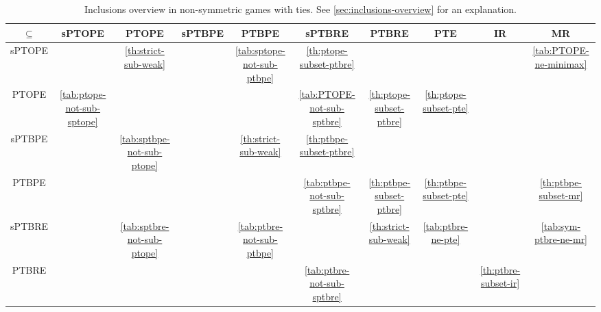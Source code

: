 \begin{sidewaystable}
	\caption{Inclusions overview in non-symmetric games with ties. See \autoref{sec:inclusions-overview} for an explanation.}
	\label{tab:overview-nosym-dup}
	\centering
	\begin{tabular}{|c|c|c|c|c|c|c|c|c|c|}
		\hline
		$\subseteq$  & sPTOPE & PTOPE & sPTBPE & PTBPE & sPTBRE & PTBRE & PTE & IR & MR \\
		\hline
		sPTOPE & \cellcolor{gray!30} & \cellcolor{green!30} \autoref{th:strict-sub-weak} & \cellcolor{red!15} & \cellcolor{red!25} \autoref{tab:sptope-not-sub-ptbpe} & \cellcolor{green!30} \autoref{th:ptope-subset-ptbre} & \cellcolor{green!15} & \cellcolor{green!15} & \cellcolor{green!15} & \cellcolor{red!30} \autoref{tab:PTOPE-ne-minimax} \\
		\hline
		PTOPE & \cellcolor{red!30} \autoref{tab:ptope-not-sub-sptope} & \cellcolor{gray!30} & \cellcolor{red!15} & \cellcolor{red!15} & \cellcolor{red!30} \autoref{tab:PTOPE-not-sub-sptbre} & \cellcolor{green!30} \autoref{th:ptope-subset-ptbre} & \cellcolor{green!30} \autoref{th:ptope-subset-pte} & \cellcolor{green!15} & \cellcolor{red!15} \\
		\hline
		sPTBPE & \cellcolor{red!15} & \cellcolor{red!30} \autoref{tab:sptbpe-not-sub-ptope} & \cellcolor{gray!30} & \cellcolor{green!30} \autoref{th:strict-sub-weak} & \cellcolor{green!30} \autoref{th:ptbpe-subset-ptbre} & \cellcolor{green!15} & \cellcolor{green!15} & \cellcolor{green!15} & \cellcolor{green!15} \\
		\hline
		PTBPE & \cellcolor{red!15} & \cellcolor{red!15} & \cellcolor{red!15} & \cellcolor{gray!30} & \cellcolor{red!30} \autoref{tab:ptbpe-not-sub-sptbre} & \cellcolor{green!30} \autoref{th:ptbpe-subset-ptbre} & \cellcolor{green!30} \autoref{th:ptbpe-subset-pte} & \cellcolor{green!15} & \cellcolor{green!30} \autoref{th:ptbpe-subset-mr} \\
		\hline
		sPTBRE & \cellcolor{red!15} & \cellcolor{red!30} \autoref{tab:sptbre-not-sub-ptope} & \cellcolor{red!15} & \cellcolor{red!30} \autoref{tab:ptbre-not-sub-ptbpe} & \cellcolor{gray!30} & \cellcolor{green!30} \autoref{th:strict-sub-weak} & \cellcolor{red!30} \autoref{tab:ptbre-ne-pte} & \cellcolor{green!15} & \cellcolor{red!30} \autoref{tab:sym-ptbre-ne-mr} \\
		\hline
		PTBRE & \cellcolor{red!15} & \cellcolor{red!15} & \cellcolor{red!15} & \cellcolor{red!15} & \cellcolor{red!30} \autoref{tab:ptbre-not-sub-sptbre} & \cellcolor{gray!30} & \cellcolor{red!15} & \cellcolor{green!30} \autoref{th:ptbre-subset-ir} & \cellcolor{red!15} \\

\end{tabular}
\end{sidewaystable}
